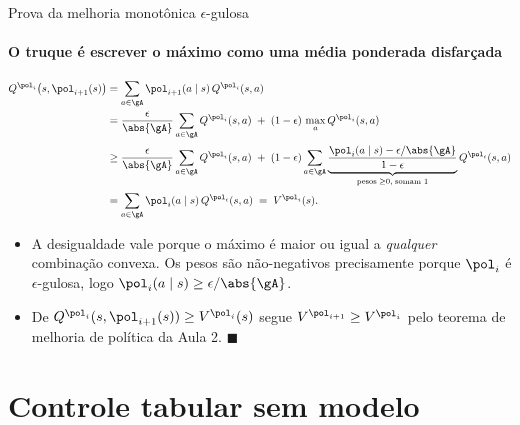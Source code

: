 \documentclass[aspectratio=169, 11pt]{beamer}
\begin{document}
\begin{frame}{Prova da melhoria monotônica $\epsilon$-gulosa}
  \framesubtitle{O truque é escrever o máximo como uma média ponderada disfarçada}

  {\footnotesize
  \begin{align*}
    Q^{\pol_i}\bigl(s, \pol_{i+1}(s)\bigr)
      &= \sum_{a \in \gA} \pol_{i+1}(a\mid s)\, Q^{\pol_i}(s,a) \\
      &= \frac{\epsilon}{\abs{\gA}} \sum_{a \in \gA} Q^{\pol_i}(s,a)
         \;+\; (1-\epsilon)\, \max_{a} Q^{\pol_i}(s,a) \\[0.4ex]
      &\ge \frac{\epsilon}{\abs{\gA}} \sum_{a \in \gA} Q^{\pol_i}(s,a)
         \;+\; (1-\epsilon) \sum_{a \in \gA}
           \underbrace{\frac{\pol_i(a\mid s) - \epsilon/\abs{\gA}}{1-\epsilon}}_{\text{pesos} \;\ge 0,\; \text{somam } 1}
           Q^{\pol_i}(s,a) \\[0.4ex]
      &= \sum_{a \in \gA} \pol_i(a \mid s)\, Q^{\pol_i}(s,a) \;=\; V^{\pol_i}(s).
  \end{align*}}

  \vspace{-0.5em}
  \begin{itemize}\setlength{\itemsep}{0.2ex}
    \item[] {\footnotesize A desigualdade vale porque o máximo é maior ou
      igual a \emph{qualquer} combinação convexa. Os pesos são não-negativos
      precisamente porque $\pol_i$ é $\epsilon$-gulosa, logo
      $\pol_i(a\mid s) \ge \epsilon/\abs{\gA}$.}
    \item[] {\footnotesize De $Q^{\pol_i}(s,\pol_{i+1}(s)) \ge V^{\pol_i}(s)$
      segue $V^{\pol_{i+1}} \ge V^{\pol_i}$ pelo teorema de melhoria de
      política da Aula 2. \hfill $\blacksquare$}
  \end{itemize}
\end{frame}

\section{Controle tabular sem modelo}
\end{document}
